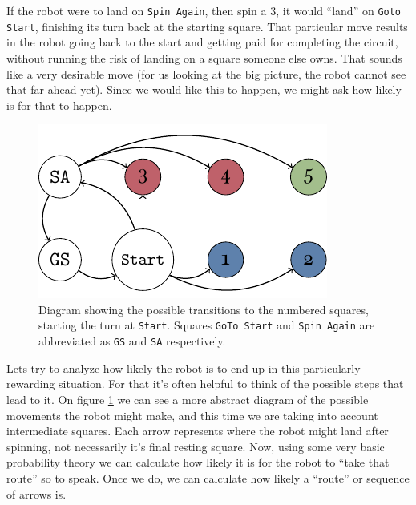 If the robot were to land on \texttt{Spin Again}, then spin a 
3, it would ``land'' on \texttt{Goto Start}, finishing its turn 
back at the starting square. That particular move results in 
the robot going back to the start and getting paid for 
completing the circuit, without running the risk of landing on 
a square someone else owns. That sounds like a very desirable 
move (for us looking at the big picture, the robot cannot see 
that far ahead yet). Since we would like this to happen, we 
might ask how likely is for that to happen.

\begin{figure}
\centering
\includegraphics[width=\textwidth]{img/transicion.pdf}
\caption{Diagram showing the possible transitions to the 
numbered squares, starting the turn at \texttt{Start}. Squares 
\texttt{GoTo Start} and \texttt{Spin Again} are abbreviated as 
\texttt{GS} and \texttt{SA} respectively.}
\label{fig:markov-start}
\end{figure}

Lets try to analyze how likely the robot is to end up in this 
particularly rewarding situation. For that it's often helpful 
to think of the possible steps that lead to it. On figure 
\ref{fig:markov-start} we can see a more abstract 
diagram of the possible movements the robot might make, and 
this time we are taking into account intermediate squares. Each 
arrow represents where the robot might land after spinning, not 
necessarily it's final resting square. Now, using some very 
basic probability theory we can calculate how likely it is for 
the robot to ``take that route'' so to speak. Once we do, we 
can calculate how likely a ``route'' or sequence of arrows is.

